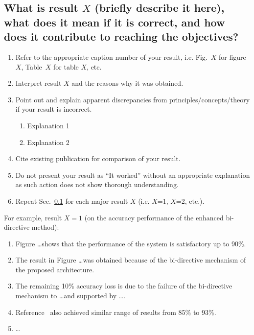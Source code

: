 \subsection{What is result $X$ (briefly describe it here), what does it mean if it is correct, and how does it contribute to reaching the objectives?}
\label{sec:resn}
		
		\begin{enumerate}		
		\item Refer to the appropriate caption number of your result, i.e. Fig.~$X$ for figure $X$, Table~$X$ for table $X$, etc.	
		\item Interpret result $X$ and the reasons why it was obtained. 
		
		\item Point out and explain apparent discrepancies from principles/concepts/theory if your result is incorrect.
		
		\begin{enumerate}
			\item Explanation 1
			
			\item Explanation 2
		\end{enumerate}
		
		\item Cite existing publication for comparison of your result.
		
		\item Do not present your result as ``It worked'' without an appropriate explanation as such action does not show thorough understanding.
	
						
		\item Repeat Sec.~\ref{sec:resn} for each major result $X$ (i.e. $X$=1, $X$=2, etc.).		
	\end{enumerate}

For example, result $X = 1$ (on the accuracy performance of the enhanced bi-directive method):

\begin{enumerate}
\item Figure \ldots shows that the performance of the system is satisfactory up to 90\%.
\item The result in Figure \ldots was obtained because of the bi-directive mechanism of the proposed architecture.
\item The remaining 10\% accuracy loss is due to the failure of the bi-directive mechanism to \ldots and supported by \ldots.
\item Reference~\cite{Einstein1905} also achieved similar range of results from 85\% to 93\%.
\item \ldots
\end{enumerate}
	
